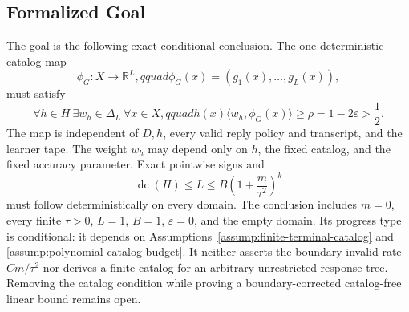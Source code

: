 \subsection{Formalized Goal}

The goal is the following exact conditional conclusion.  The one deterministic
catalog map
\[
\phi_G:X\to\mathbb R^L,qquad
\phi_G(x)=(g_1(x),\ldots,g_L(x)),
\]
must satisfy
\[
\forall h\in H\ \exists w_h\in\Delta_L\ \forall x\in X,qquad
h(x)\langle w_h,\phi_G(x)\rangle
\ge\rho=1-2\varepsilon>\frac12.
\]
The map is independent of $D,h$, every valid reply policy and transcript, and
the learner tape.  The weight $w_h$ may depend only on $h$, the fixed catalog,
and the fixed accuracy parameter.  Exact pointwise signs and
\[
\operatorname{dc}(H)\le L
\le B\left(1+\frac{m}{\tau^2}\right)^k
\]
must follow deterministically on every domain.  The conclusion includes
$m=0$, every finite $\tau>0$, $L=1$, $B=1$, $\varepsilon=0$, and the empty
domain.  Its progress type is conditional: it depends on
Assumptions~\ref{assump:finite-terminal-catalog} and
\ref{assump:polynomial-catalog-budget}.  It neither asserts the
boundary-invalid rate $Cm/\tau^2$ nor derives a finite catalog for an arbitrary
unrestricted response tree.  Removing the catalog condition while proving a
boundary-corrected catalog-free linear bound remains open.
